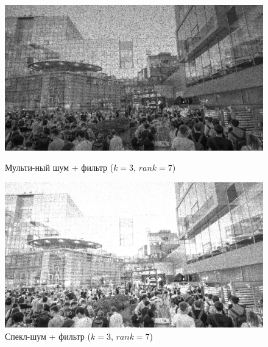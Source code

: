\documentclass[a4paper]{article}
\begin{document}
\begin{figure}[H]
    \begin{minipage}{0.49\textwidth}
        \centering \includegraphics[width=\textwidth]{images/3_nonlinear_filters/multiplicative - rang (k=3, rank=7).jpg}
        \caption{Мульти-ный шум + фильтр ($k = 3$, $rank = 7$)}
    \end{minipage}\hfill
    \begin{minipage}{0.49\textwidth}
        \centering \includegraphics[width=\textwidth]{images/3_nonlinear_filters/speckle - rang (k=3, rank=7).jpg}
        \caption{Спекл-шум + фильтр ($k = 3$, $rank = 7$)}
    \end{minipage}
\end{figure}
\end{document}
